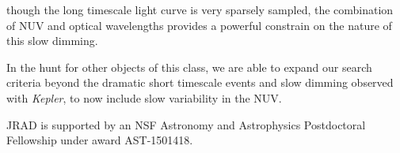 \documentclass[manuscript, letterpaper]{aastex6}
\newcommand{\Kepler}{\textsl{Kepler}\xspace}
\begin{document}
though the long timescale light curve is very sparsely sampled, the combination of NUV and optical wavelengths provides a powerful constrain on the nature of this slow dimming. 

In the hunt for other objects of this class, we are able to expand our search criteria beyond the dramatic short timescale events and slow dimming observed with \Kepler, to now include slow variability in the NUV. 



\acknowledgments
JRAD is supported by an NSF Astronomy and Astrophysics Postdoctoral Fellowship under award AST-1501418. 



\end{document}
